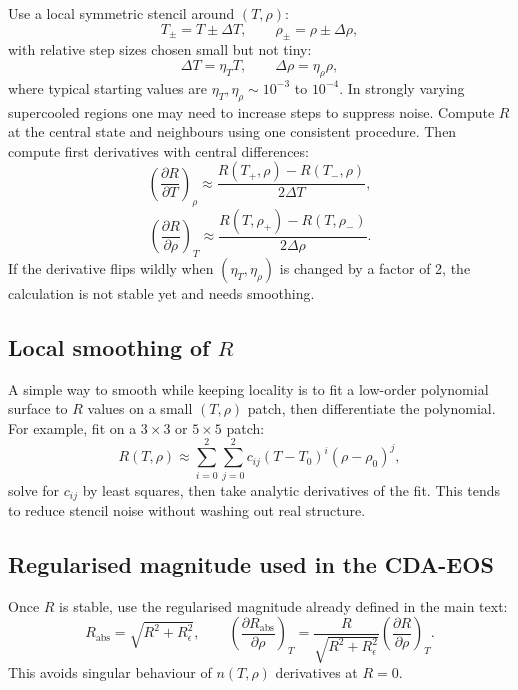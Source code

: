 \documentclass[12pt]{article}
\begin{document}
Use a local symmetric stencil around $(T,\rho)$:
\begin{equation}
  T_\pm=T\pm\Delta T,
  \qquad \rho_\pm=\rho\pm\Delta\rho,
\end{equation}
with relative step sizes chosen small but not tiny:
\begin{equation}
  \Delta T=\eta_T T,
  \qquad \Delta\rho=\eta_\rho\rho,
\end{equation}
where typical starting values are $\eta_T,\eta_\rho\sim 10^{-3}$ to $10^{-4}$. In strongly varying supercooled regions one may need to increase steps to suppress noise. Compute $R$ at the central state and neighbours using one consistent procedure. Then compute first derivatives with central differences:
\begin{equation}
  \left(\frac{\partial R}{\partial T}\right)_\rho\approx\frac{R(T_+,\rho)-R(T_-,\rho)}{2\Delta T},
\end{equation}
\begin{equation}
  \left(\frac{\partial R}{\partial\rho}\right)_T\approx\frac{R(T,\rho_+)-R(T,\rho_-)}{2\Delta\rho}.
\end{equation}
If the derivative flips wildly when $(\eta_T,\eta_\rho)$ is changed by a factor of 2, the calculation is not stable yet and needs smoothing.

\subsection{Local smoothing of $R$}

A simple way to smooth while keeping locality is to fit a low-order polynomial surface to $R$ values on a small $(T,\rho)$ patch, then differentiate the polynomial. For example, fit on a $3\times3$ or $5\times5$ patch:
\begin{equation}
  R(T,\rho)\approx\sum_{i=0}^{2}\sum_{j=0}^{2}c_{ij}(T-T_0)^i(\rho-\rho_0)^j,
\end{equation}
solve for $c_{ij}$ by least squares, then take analytic derivatives of the fit. This tends to reduce stencil noise without washing out real structure.

\subsection{Regularised magnitude used in the CDA-EOS}

Once $R$ is stable, use the regularised magnitude already defined in the main text:
\begin{equation}
  R_{\mathrm{abs}}=\sqrt{R^2+R_\epsilon^2},
  \qquad
  \left(\frac{\partial R_{\mathrm{abs}}}{\partial\rho}\right)_T=
  \frac{R}{\sqrt{R^2+R_\epsilon^2}}\left(\frac{\partial R}{\partial\rho}\right)_T.
\end{equation}
This avoids singular behaviour of $n(T,\rho)$ derivatives at $R=0$.
\end{document}
